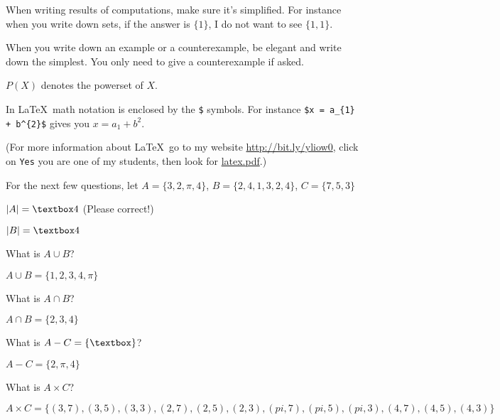 


\renewcommand\AUTHOR{nweadick1@cougars.ccis.edu} %


\topmattertwo

When writing results of computations, make sure it's simplified.
For instance when you write down sets,
if the answer is $\{1\}$, I do not
want to see $\{1, 1\}$.

When you write down an example or a counterexample,
be elegant and write down the simplest.
You only need to give a counterexample if asked.

$P(X)$ denotes the powerset of $X$.

In \LaTeX\, math notation is enclosed by the \verb!$! symbols.
For instance \verb!$x = a_{1} + b^{2}$! gives you $x = a_{1} + b^{2}$. 

(For more information about \LaTeX\, go to my
website
\href{http://bit.ly/yliow0}{http://bit.ly/yliow0},
click on \verb!Yes!
you are one of my students,
then look for
\href{https://drive.google.com/file/d/0BzjYrK0VFuMWZm5xV0kyR3J2Zm8/view?usp=sharing}{latex.pdf}.)

For the next few questions,
let $A = \{3, 2, \pi, 4\}$, $B = \{2,4,1,3,2,4\}$, $C = \{7, 5, 3\}$ 

\nextq
$|A| =  \answerbox{ 4 } $ (Please correct!)

\nextq
$|B| = \answerbox{ 4 } $

\nextq
What is $A \cup B$?
\begin{answerlong}
$A \cup B = \{ 1,2,3,4,\pi\}$
\end{answerlong}

\nextq
What is $A \cap B$?
\begin{answerlong}
$A \cap B = \{2,3,4\}$
\end{answerlong}

\nextq
What is $A - C = \{ \answerbox{} \}$?
\begin{answerlong}
$A - C = \{ 2, \pi, 4 \}$
\end{answerlong}

\nextq
What is $A \times C$?
\begin{answerlong}
$A \times C = \{ (3,7),(3,5),(3,3),(2,7),(2,5),(2,3),(pi,7),(pi,5),(pi,3),(4,7),(4,5),(4,3)\}$
\end{answerlong}

